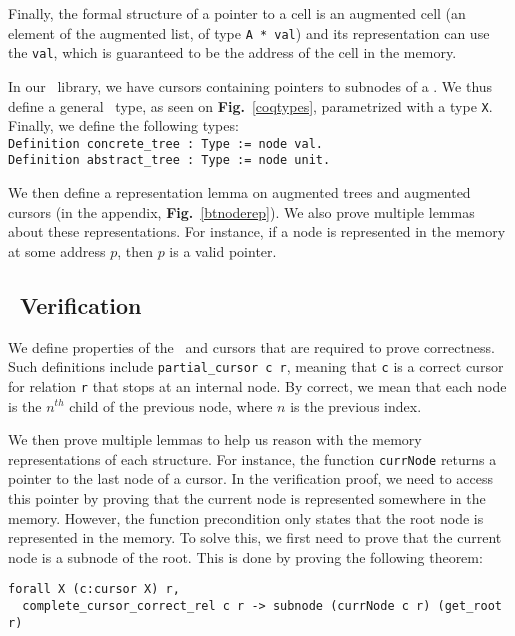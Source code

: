 Finally, the formal structure of a pointer to a cell is an augmented cell (an element of the augmented list, of type \lstinline{A * val}) and its representation can use the \lstinline{val}, which is guaranteed to be the address of the cell in the memory.

In our \btrees\ library, we have cursors containing pointers to subnodes of a \btree. We thus define a general \btree\ type, as seen on \textbf{Fig.}~\ref{coqtypes}, parametrized with a type \texttt{X}.
Finally, we define the following types:\\
\lstinline[language=Coq]{Definition concrete_tree : Type := node val.}\\
\lstinline[language=Coq]{Definition abstract_tree : Type := node unit.}

We then define a representation lemma on augmented trees and augmented cursors (in the appendix, \textbf{Fig.}~\ref{btnoderep}).
We also prove multiple lemmas about these representations. For instance, if a node is represented in the memory at some address $p$, then $p$ is a valid pointer.

\subsection{\btrees\ Verification}
\label{subsec:btverif}
We define properties of the \btrees\ and cursors that are required to prove correctness.
Such definitions include \texttt{partial\_cursor c r}, meaning that \texttt{c} is a correct cursor for relation \texttt{r} that stops at an internal node.
By correct, we mean that each node is the $n^{th}$ child of the previous node, where $n$ is the previous index.

We then prove multiple lemmas to help us reason with the memory representations of each structure.
For instance, the function \texttt{currNode} returns a pointer to the last node of a cursor.
In the verification proof, we need to access this pointer by proving that the current node is represented somewhere in the memory.
However, the function precondition only states that the root node is represented in the memory.
To solve this, we first need to prove that the current node is a subnode of the root.
This is done by proving the following theorem:
\begin{lstlisting}[language=Coq]
  forall X (c:cursor X) r,
  complete_cursor_correct_rel c r -> subnode (currNode c r) (get_root r)
\end{lstlisting}

